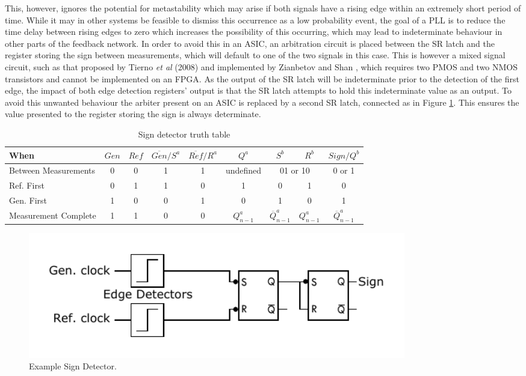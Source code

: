 This, however, ignores the potential for metastability which may arise if both signals have a rising edge within an extremely short period of time. While it may in other systems be feasible to dismiss this occurrence as a low probability event, the goal of a \ac{PLL} is to reduce the time delay between rising edges to zero which increases the possibility of this occurring, which may lead to indeterminate behaviour in other parts of the feedback network. In order to avoid this in an \ac{ASIC}, an arbitration circuit is placed between the \ac{SR} latch and the register storing the sign between measurements, which will default to one of the two signals in this case. This is however a mixed signal circuit, such as that proposed by Tierno \textit{et al} (2008) and implemented by Zianbetov and Shan \cite{tierno2008wide,zianbetov2013phd,shan2014phd}, which requires two \ac{PMOS} and two \ac{NMOS} transistors and cannot be implemented on an \ac{FPGA}. As the output of the \ac{SR} latch will be indeterminate prior to the detection of the first edge, the impact of both edge detection registers' output is that the \ac{SR} latch attempts to hold this indeterminate value as an output. To avoid this unwanted behaviour the arbiter present on an \ac{ASIC} is replaced by a second \ac{SR} latch, connected as in Figure \ref{fig:arbitration}. This ensures the value presented to the register storing the sign is always determinate.
\begin{table}[!ht]
	\begin{center}
		\setlength{\tabcolsep}{.5\tabcolsep}
		\begin{tabular}{l|cc|cc|c|cc|c}           
			When&$Gen$&$Ref$&$\overline{Gen}/S^a$&$\overline{Ref}/R^a$&$Q^a$&$S^b$&$R^b$&$Sign/Q^b$\\
			\hline
			Between Measurements&0&0&1&1&\multicolumn{1}{c|}{undefined}&\multicolumn{2}{c|}{01 or 10}&\multicolumn{1}{c}{0 or 1}\T\\
			Ref. First&0&1&1&0&1&0&1&0\T\\
			Gen. First&1&0&0&1&0&1&0&1\T\\	
			Measurement Complete&1&1&0&0&$Q^a_{n-1}$&$\overline{Q}^a_{n-1}$&$Q^a_{n-1}$&$\overline{Q}^a_{n-1}$\T\\					
		\end{tabular}
		\caption{Sign detector truth table}
		\label{table:sign_tt}
	\end{center}
\end{table}
\begin{figure}[h]
	\centering
	\includegraphics[width=0.8\textwidth]{../simple_sign_detection}
	\caption[Example Sign Detector]{Example Sign Detector.}
	\label{fig:arbitration}
\end{figure}


